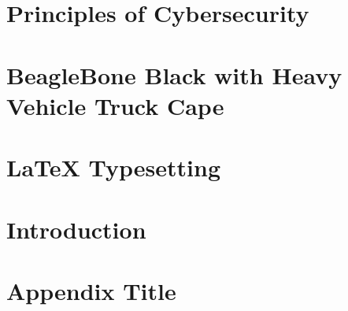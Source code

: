 \chapter{Principles of Cybersecurity}


\chapter{BeagleBone Black with Heavy Vehicle Truck Cape}


\chapter{LaTeX Typesetting}


\chapter{Introduction}


\appendix
\chapter{Appendix Title}


